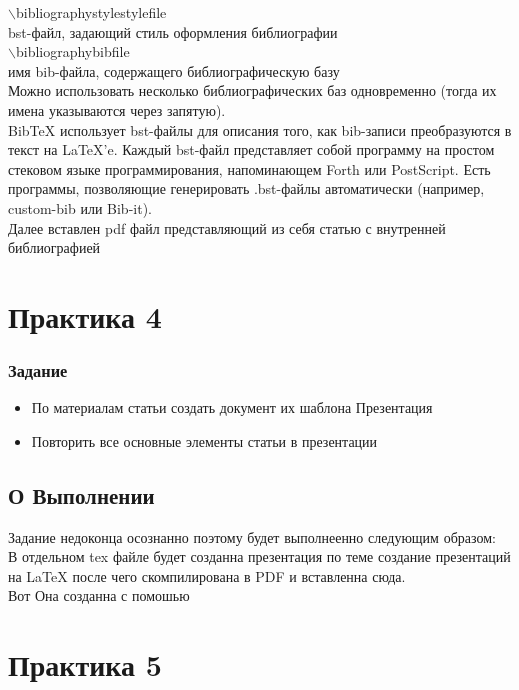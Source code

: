 \documentclass[a4paper,14pt,oneside]{book}
\theoremstyle{plain} %
\theoremstyle{definition} %
\theoremstyle{remark} %
\begin{document}
$\backslash$bibliographystyle{stylefile} \\
bst-файл, задающий стиль оформления библиографии\\

$\backslash$bibliography{bibfile} \\
имя bib-файла, содержащего библиографическую базу\\

Можно использовать несколько библиографических баз одновременно (тогда их имена указываются через запятую).\\

BibTeX использует bst-файлы для описания того, как bib-записи преобразуются в текст на LaTeX'e. Каждый bst-файл представляет собой программу на простом стековом языке программирования, напоминающем Forth или PostScript. Есть программы, позволяющие генерировать .bst-файлы автоматически (например, custom-bib или Bib-it).\\

Далее вставлен pdf файл представляющий из себя статью с внутренней библиографией\\
 



\chapter{Практика 4}
\subsection{Задание}
\begin{itemize}
\item По материалам статьи создать документ их шаблона Презентация 
\item Повторить все основные элементы статьи в презентации 
\end{itemize}
\section{О Выполнении}
Задание недоконца осознанно поэтому будет выполнеенно следующим образом:\\
В отдельном tex файле будет созданна презентация по теме создание презентаций на \LaTeX{} после чего скомпилирована в PDF и вставленна сюда.\\
Вот Она созданна с помошью \cite{pres1}
 

\chapter{Практика 5}
\end{document}
